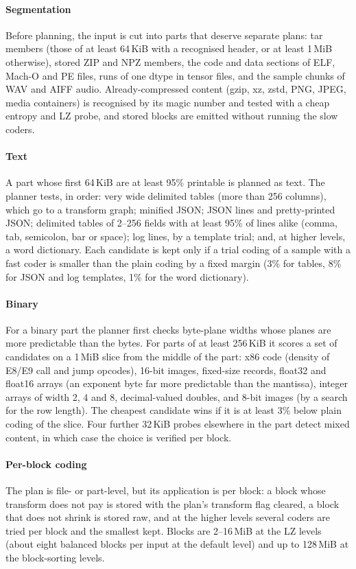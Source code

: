 \documentclass[conference]{IEEEtran}
\begin{document}
\paragraph*{Segmentation} Before planning, the input is cut into parts that deserve separate plans: tar members
(those of at least 64\,KiB with a recognised header, or at least 1\,MiB otherwise), stored ZIP and NPZ members, the
code and data sections of ELF, Mach-O and PE files, runs of one dtype in tensor files, and the sample chunks of WAV
and AIFF audio. Already-compressed content (gzip, xz, zstd, PNG, JPEG, media containers) is recognised by its magic
number and tested with a cheap entropy and LZ probe, and stored blocks are emitted without running the slow coders.

\paragraph*{Text} A part whose first 64\,KiB are at least 95\% printable is planned as text. The planner tests, in
order: very wide delimited tables (more than 256 columns), which go to a transform graph; minified JSON; JSON lines and
pretty-printed JSON; delimited tables of 2--256 fields with at least 95\% of lines alike (comma, tab, semicolon, bar
or space); log lines, by a template trial; and, at higher levels, a word dictionary. Each candidate is kept only if a
trial coding of a sample with a fast coder is smaller than the plain coding by a fixed margin (3\% for tables, 8\% for
JSON and log templates, 1\% for the word dictionary).

\paragraph*{Binary} For a binary part the planner first checks byte-plane widths whose planes are more predictable
than the bytes. For parts of at least 256\,KiB it scores a set of candidates on a 1\,MiB slice from the middle of the
part: x86 code (density of E8/E9 call and jump opcodes), 16-bit images, fixed-size records, float32 and float16
arrays (an exponent byte far more predictable than the mantissa), integer arrays of width 2, 4 and 8, decimal-valued
doubles, and 8-bit images (by a search for the row length). The cheapest candidate wins if it is at least 3\% below
plain coding of the slice. Four further 32\,KiB probes elsewhere in the part detect mixed content, in which case the
choice is verified per block.

\paragraph*{Per-block coding} The plan is file- or part-level, but its application is per block: a block whose
transform does not pay is stored with the plan's transform flag cleared, a block that does not shrink is stored raw,
and at the higher levels several coders are tried per block and the smallest kept. Blocks are 2--16\,MiB at the LZ
levels (about eight balanced blocks per input at the default level) and up to 128\,MiB at the block-sorting levels.
\end{document}

